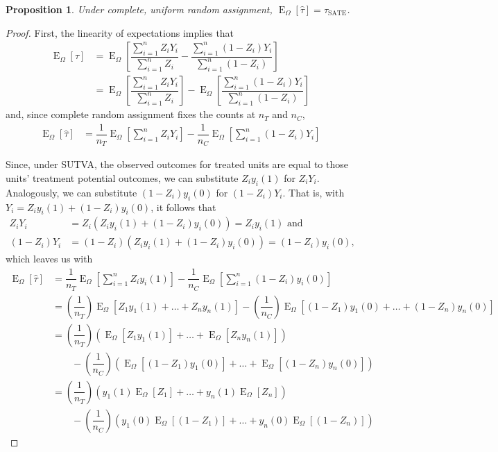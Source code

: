 \documentclass[12pt,leqno]{article}
\theoremstyle{newstyle}
\newtheorem{prop}[thm]{Proposition}
\DeclareMathOperator{\E}{\mathrm{E}}
\DeclareMathOperator{\Var}{\mathrm{Var}}
\newcommand{\bZ}{\bm{Z}}   \newcommand{\bz}{\bm{z}}   %
\newcommand{\EZ}{\E_{\Omega}}    \newcommand{\VarZ}{\Var_{\Omega}}  %
\newcommand{\po}[2]{y_{#1}(#2)}     %
\newcommand{\tauS}{\tau_{\text{SATE}}}
\newcommand{\tauhat}{\hat{\tau}}
\begin{document}
\begin{prop} \label{prop: complete ran assign}
Under complete, uniform random assignment, $\EZ[\tauhat] = \tauS$.
\end{prop}
\begin{proof}
First, the linearity of expectations implies that
\begin{align*}
\EZ \left[\tauhat\right] & = \EZ\left[\dfrac{\sum \limits_{i = 1}^n Z_i Y_i}{\sum\limits_{i = 1}^n Z_i}  - \dfrac{\sum \limits_{i = 1}^n \left(1 - Z_i\right) Y_i}{\sum\limits_{i = 1}^n \left(1 - Z_i\right)}\right] \\
& = \EZ\left[\dfrac{\sum \limits_{i = 1}^n Z_i Y_i}{\sum\limits_{i = 1}^n Z_i}\right] - \EZ\left[\dfrac{\sum \limits_{i = 1}^n \left(1 - Z_i\right) Y_i}{\sum\limits_{i = 1}^n \left(1 - Z_i\right)}\right]
\end{align*}
and, since complete random assignment fixes the counts at $n_T$ and $n_C$, 
\begin{align*}
\EZ \left[\tauhat\right] & = \dfrac{1}{n_T} \EZ\left[\sum \limits_{i = 1}^n Z_i Y_{i}\right] - \dfrac{1}{n_C}\EZ\left[\sum \limits_{i = 1}^n \left(1 - Z_i\right) Y_{i}\right]
\end{align*}

Since, under SUTVA, the observed outcomes for treated units are equal to those units' treatment potential outcomes, we can substitute $Z_i \po{i}{1}$ for $Z_i Y_i$. Analogously, we can substitute $(1 - Z_i)\po{i}{0}$ for $(1 - Z_i)Y_{i}$. That is, with $Y_i = Z_i \po{i}{1} + (1 - Z_i)\po{i}{0}$, it follows that
\begin{align*}
Z_i Y_i & = Z_i\left(Z_i \po{i}{1} + (1 - Z_i)\po{i}{0}\right) = Z_i \po{i}{1} \text{ and} \\ 
(1 - Z_i) Y_i & = (1 - Z_i)\left(Z_i \po{i}{1} + (1 - Z_i)\po{i}{0}\right) = (1 - Z_i) \po{i}{0},
\end{align*}
which leaves us with
\begin{align*}
\EZ \left[\tauhat\right] & = \dfrac{1}{n_T} \EZ\left[\sum \limits_{i = 1}^n Z_i \po{i}{1}\right] - \dfrac{1}{n_C}\EZ\left[\sum \limits_{i = 1}^n \left(1 - Z_i\right) \po{i}{0}\right] \\
& = \left(\dfrac{1}{n_T} \right) \EZ \left[ Z_1 \po{1}{1} + \dots + Z_n \po{n}{1}\right] - \left(\dfrac{1}{n_C}\right) \EZ\left[\left(1 - Z_1\right) \po{1}{0} + \dots + \left(1 - Z_n\right) \po{n}{0} \right] \\
& = \left(\dfrac{1}{n_T} \right) \left(\EZ \left[ Z_1 \po{1}{1}\right] + \dots + \EZ \left[Z_n \po{n}{1}\right]\right) \\
& \qquad - \left(\dfrac{1}{n_C}\right) \left(\EZ\left[\left(1 - Z_1\right) \po{1}{0}\right] + \dots + \EZ \left[\left(1 - Z_n\right) \po{n}{0} \right]\right) \\
& = \left(\dfrac{1}{n_T} \right) \left(\po{1}{1}\EZ \left[ Z_1 \right] + \dots + \po{n}{1}\EZ \left[Z_n\right]\right) \\
& \qquad - \left(\dfrac{1}{n_C}\right) \left(\po{1}{0}\EZ\left[\left(1 - Z_1\right) \right] + \dots + \po{n}{0}\EZ \left[\left(1 - Z_n\right) \right]\right)
\end{align*}


\end{proof}
\end{document}
